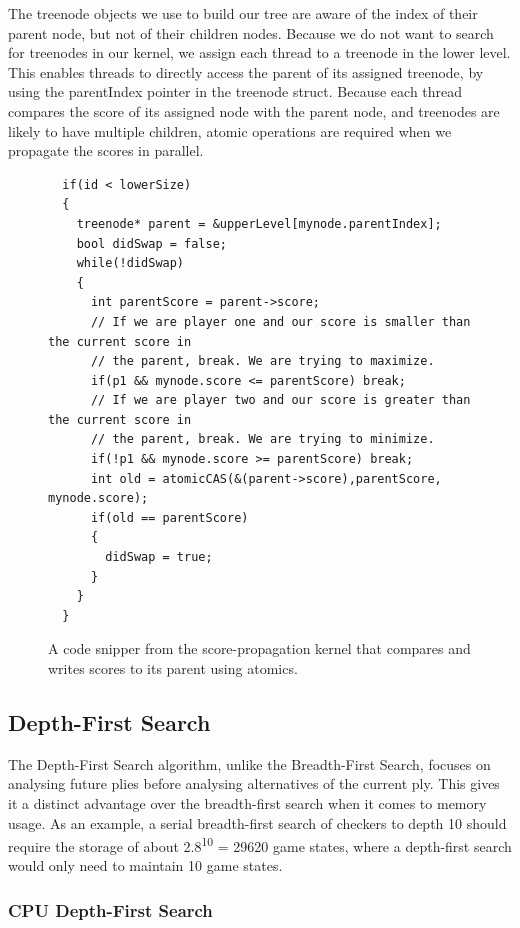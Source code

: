 \documentclass[11pt]{article}
\begin{document}
The treenode objects we use to build our tree are aware of the index of their
parent node, but not of their children nodes. Because we do not want to search
for treenodes in our kernel, we assign each thread to a treenode in the lower
level. This enables threads to directly access the parent of its assigned
treenode, by using the parentIndex pointer in the treenode struct. Because each
thread compares the score of its assigned node with the parent node, and
treenodes are likely to have multiple children, atomic operations are required
when we propagate the scores in parallel.

\begin{figure}
\begin{lstlisting}
  if(id < lowerSize)
  {
    treenode* parent = &upperLevel[mynode.parentIndex];
    bool didSwap = false;
    while(!didSwap)
    {
      int parentScore = parent->score;
      // If we are player one and our score is smaller than the current score in
      // the parent, break. We are trying to maximize.
      if(p1 && mynode.score <= parentScore) break;
      // If we are player two and our score is greater than the current score in
      // the parent, break. We are trying to minimize.
      if(!p1 && mynode.score >= parentScore) break;
      int old = atomicCAS(&(parent->score),parentScore, mynode.score);
      if(old == parentScore)
      {
        didSwap = true;
      }
    }
  }
\end{lstlisting}
\caption{A code snipper from the score-propagation kernel that compares and
writes scores to its parent using atomics.}
\end{figure}

\newpage
\subsection{Depth-First Search}
\label{sec:gpudfs}

The Depth-First Search algorithm, unlike the Breadth-First Search, focuses on
analysing future plies before analysing alternatives of the current ply. This
gives it a distinct advantage over the breadth-first search when it comes to
memory usage. As an example, a serial breadth-first search of checkers to depth
10 should require the storage of about 2.8\textsuperscript{10} = 29620 game
states, where a depth-first search would only need to maintain 10 game states.

\subsubsection{CPU Depth-First Search}
\end{document}
